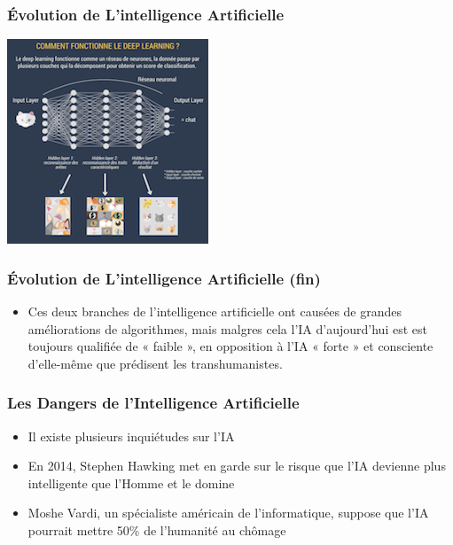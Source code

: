 \documentclass{beamer}
\begin{document}
	\begin{frame}[fragile]
	\frametitle{Évolution de L'intelligence  Artificielle}
	
	\centerline{\includegraphics{deeplearning.png}}%
	
	\end{frame}
	
		\begin{frame}[fragile]
	\frametitle{Évolution de L'intelligence  Artificielle (fin)}
	\begin{itemize}
		\item Ces deux branches de l'intelligence artificielle ont causées de grandes améliorations de algorithmes, mais malgres cela l'IA d'aujourd'hui est est toujours qualifiée de « faible », en opposition à l’IA « forte » et consciente d’elle-même que prédisent les transhumanistes.

	\end{itemize}
	\end{frame}
	
	\begin{frame}[fragile]
	\frametitle{Les Dangers de l'Intelligence Artificielle}
	\begin{itemize}
	\itemsep1em
		\item Il existe plusieurs inquiétudes sur l'IA
		\item En 2014, Stephen Hawking met en garde sur le risque que l'IA devienne plus intelligente que l'Homme et le domine
		\item Moshe Vardi, un spécialiste américain de l'informatique, suppose que l'IA pourrait mettre 50\% de l'humanité au chômage
		\end{itemize}
	\end{frame}
	
\end{document}
